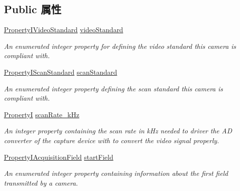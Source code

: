 \subsection*{Public 属性}
\begin{DoxyCompactItemize}
\item 
\hyperlink{group___device_specific_interface_ga8b964e42762ee1cba12e1b4bd9c9f114}{Property\+I\+Video\+Standard} \hyperlink{classmv_i_m_p_a_c_t_1_1acquire_1_1_camera_description_standard_base_a4677d000f2ddaec6e356b6cc48eb50e0}{video\+Standard}
\begin{DoxyCompactList}\small\item\em An enumerated integer property for defining the video standard this camera is compliant with. \end{DoxyCompactList}\item 
\hyperlink{group___device_specific_interface_gabc31d508d02db97ff522a1285a450f04}{Property\+I\+Scan\+Standard} \hyperlink{classmv_i_m_p_a_c_t_1_1acquire_1_1_camera_description_standard_base_a818090d21bb246d02c4db4474dcc32d8}{scan\+Standard}
\begin{DoxyCompactList}\small\item\em An enumerated integer property defining the scan standard this camera is compliant with. \end{DoxyCompactList}\item 
\hypertarget{classmv_i_m_p_a_c_t_1_1acquire_1_1_camera_description_standard_base_a17049ae421918e4dd00635eacea1ed17}{\hyperlink{group___common_interface_ga12d5e434238ca242a1ba4c6c3ea45780}{Property\+I} \hyperlink{classmv_i_m_p_a_c_t_1_1acquire_1_1_camera_description_standard_base_a17049ae421918e4dd00635eacea1ed17}{scan\+Rate\+\_\+k\+Hz}}\label{classmv_i_m_p_a_c_t_1_1acquire_1_1_camera_description_standard_base_a17049ae421918e4dd00635eacea1ed17}

\begin{DoxyCompactList}\small\item\em An integer property containing the scan rate in k\+Hz needed to driver the A\+D converter of the capture device with to convert the video signal properly. \end{DoxyCompactList}\item 
\hyperlink{group___device_specific_interface_ga01090436ef6969d1fedb45ce24f68d9b}{Property\+I\+Acquisition\+Field} \hyperlink{classmv_i_m_p_a_c_t_1_1acquire_1_1_camera_description_standard_base_acad50fee713c8790dc7c23b64d86a9ac}{start\+Field}
\begin{DoxyCompactList}\small\item\em An enumerated integer property containing information about the first field transmitted by a camera. \end{DoxyCompactList}\end{DoxyCompactItemize}
